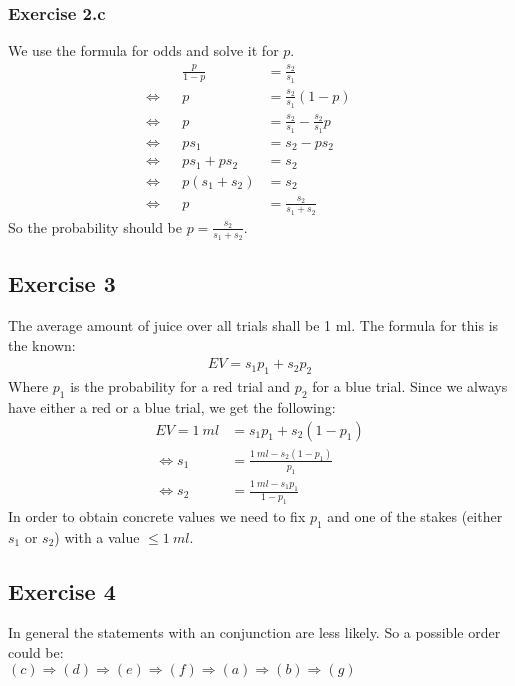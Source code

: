 \subsubsection*{Exercise 2.c}
We use the formula for odds and solve it for $p$.
\begin{align*}
                & & \frac{p}{1 - p} & = \frac{s_2}{s_1}                     & & \\
\Leftrightarrow & & p               & = \frac{s_2}{s_1} (1 - p)             & & \\
\Leftrightarrow & & p               & = \frac{s_2}{s_1} - \frac{s_2}{s_1} p & & \\
\Leftrightarrow & & p s_1           & = s_2 - p s_2                         & & \\
\Leftrightarrow & & p s_1 + p s_2   & = s_2                                 & & \\
\Leftrightarrow & & p (s_1 + s_2)   & = s_2                                 & & \\
\Leftrightarrow & & p               & = \frac{s_2}{s_1 + s_2}               & &
\end{align*}
So the probability should be $p = \frac{s_2}{s_1 + s_2}$.

\subsection*{Exercise 3}
The average amount of juice over all trials shall be 1 ml. The formula for this 
is the known:
\begin{align*}
EV = s_1 p_1 + s_2 p_2
\end{align*}
Where $p_1$ is the probability for a red trial and $p_2$ for a blue trial. 
Since we always have either a red or a blue trial, we get the following:
\begin{align*}
EV = 1 \  ml &= s_1 p_1 + s_2 (1 - p_1)\\
\Leftrightarrow s_1 &= \frac{1 \  ml - s_2 (1 - p_1)}{p_1}\\
\Leftrightarrow s_2 &= \frac{1 \  ml - s_1 p_1}{1 - p_1}
\end{align*}
In order to obtain concrete values we need to fix $p_1$ and one of the stakes 
(either $s_1$ or $s_2$) with a value $\leq 1 \  ml$.


\subsection*{Exercise 4}
In general the statements with an conjunction are less likely. So a possible order could be:\\
$(c)\Rightarrow(d)\Rightarrow(e)\Rightarrow(f)\Rightarrow(a)\Rightarrow(b)\Rightarrow(g)$

